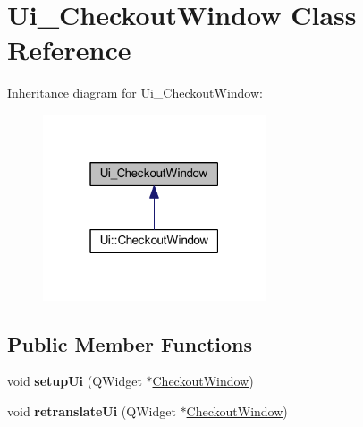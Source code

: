 \hypertarget{class_ui___checkout_window}{}\section{Ui\+\_\+\+Checkout\+Window Class Reference}
\label{class_ui___checkout_window}


Inheritance diagram for Ui\+\_\+\+Checkout\+Window\+:
\nopagebreak
\begin{figure}[H]
\begin{center}
\leavevmode
\includegraphics[width=187pt]{class_ui___checkout_window__inherit__graph}
\end{center}
\end{figure}
\subsection*{Public Member Functions}
\begin{DoxyCompactItemize}
\item 
\mbox{\label{class_ui___checkout_window_afa2930c4b8bed1675a960033ad7dfb75}} 
void {\bfseries setup\+Ui} (Q\+Widget $\ast$\hyperlink{class_checkout_window}{Checkout\+Window})
\item 
\mbox{\label{class_ui___checkout_window_aa4d7330945649474f7dd04f05e3a884d}} 
void {\bfseries retranslate\+Ui} (Q\+Widget $\ast$\hyperlink{class_checkout_window}{Checkout\+Window})
\end{DoxyCompactItemize}
